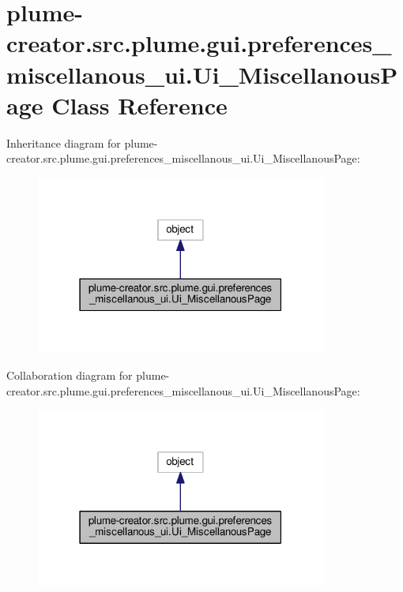\hypertarget{classplume-creator_1_1src_1_1plume_1_1gui_1_1preferences__miscellanous__ui_1_1_ui___miscellanous_page}{}\section{plume-\/creator.src.\+plume.\+gui.\+preferences\+\_\+miscellanous\+\_\+ui.\+Ui\+\_\+\+Miscellanous\+Page Class Reference}
\label{classplume-creator_1_1src_1_1plume_1_1gui_1_1preferences__miscellanous__ui_1_1_ui___miscellanous_page}


Inheritance diagram for plume-\/creator.src.\+plume.\+gui.\+preferences\+\_\+miscellanous\+\_\+ui.\+Ui\+\_\+\+Miscellanous\+Page\+:\nopagebreak
\begin{figure}[H]
\begin{center}
\leavevmode
\includegraphics[width=271pt]{classplume-creator_1_1src_1_1plume_1_1gui_1_1preferences__miscellanous__ui_1_1_ui___miscellanous_page__inherit__graph}
\end{center}
\end{figure}


Collaboration diagram for plume-\/creator.src.\+plume.\+gui.\+preferences\+\_\+miscellanous\+\_\+ui.\+Ui\+\_\+\+Miscellanous\+Page\+:\nopagebreak
\begin{figure}[H]
\begin{center}
\leavevmode
\includegraphics[width=271pt]{classplume-creator_1_1src_1_1plume_1_1gui_1_1preferences__miscellanous__ui_1_1_ui___miscellanous_page__coll__graph}
\end{center}
\end{figure}
